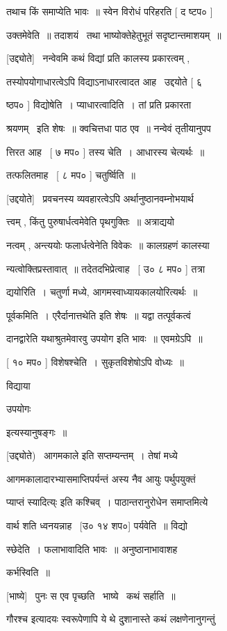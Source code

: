 \documentclass[11pt, openany]{book}
\begin{document}
तथाच किं समाप्येति भावः~॥ स्वेन विरोधं परिहरति [ द ष्टप० ] 

उक्तमेवेति~॥ तदाशयं \textendash\ तथा भाष्योक्तेहेतुभूतं सदृष्टान्तमाशयम्~॥ 

[उद्द्योते] \textendash\ नन्वेवमि कथं विद्यां प्रति कालस्य प्रकारत्वम् , 

तस्योपयोगाधारत्वेऽपि विद्याऽनाधारत्वादत आह \textendash\ उद्दयोते [ ६ 

ष्ठप० ] विद्योषेति~। प्याधारत्वादिति~। तां प्रति प्रकारता \textendash\ 

श्रयणम् \textendash\ इति शेषः~॥ क्वचित्तधा पाठ एव~॥ नन्वेवं तृतीयानुपप \textendash\ 

त्तिरत आह \textendash\ [ ७ मप० ] तस्य चेति~। आधारस्य चेत्यर्थः~॥ 

तत्फलितमाह \textendash\ [ ८ मप० ] चतुर्ष्विति~॥ 

[उद्दयोते] \textendash\ प्रवचनस्य व्यवहारत्वेऽपि अर्थानुष्ठानवम्नोभयार्थ \textendash\ 

त्त्वम् , किंतु पुरुषार्धत्वमेवेति पृथगुक्तिः~॥ {\qt अत्राद्ययो} \textendash\ 

नत्वम् , अन्त्ययोः फलार्धत्वेनेति विवेकः~॥ कालग्रहणं कालस्या \textendash\ 

न्यत्वोक्तिप्रस्तावात्~॥ तदेतदभिप्रेत्वाह \textendash\ [ उ० ८ मप० ] तत्रा \textendash\ 

द्ययोरिति~। चतुर्णा मध्ये, आगमस्वाध्यायकालयोरित्यर्थः~॥ 

पूर्वकमिति~। एरैर्दानात्तथेति इति शेषः~॥ यद्वा तत्पूर्वकत्वं 

दानद्वारेति यथाश्रुतमेवारवु उपयोग इति भावः~॥ एवमग्रेऽपि~॥ 

[ १० मप० ] विशेषश्चेति~। सुकृतविशेषोऽपि वोध्यः~॥ {\qt विद्याया 

उपयोगः} इत्यस्यानुषङ्गः~॥ 

[उद्द्योते) \textendash\ {\qt आगमकाले इति सप्तम्यन्तम्~।} तेषां मध्ये 

आगमकालादारभ्यासमाप्तिपर्यन्तं अस्य नैव आयुः पर्थुपयुक्तं 

प्याप्तं स्यादित्य्ः इति कश्चिव्~। पाठान्तरानुरोधेन समाप्तमित्ये \textendash\ 

वार्थ शति ध्वनयन्नाह \textendash\ [उ० १४ शप०] पर्यवेति~॥ विद्यो \textendash\ 

स्छेदेति~। फलाभावादिति भावः~॥ अनुष्ठानाभावाशह \textendash\ 

कर्भस्विति~॥ 

[भाष्ये] \textendash\ पुनः स एव पृच्छति \textendash\ भाष्ये \textendash\ कथं सर्हाति~॥ 

गौरश्च इत्यादयः स्वरूपेणापि ये थे दु्शानास्ते कथं लक्षणेनानुगन्तुं 
\end{document}
